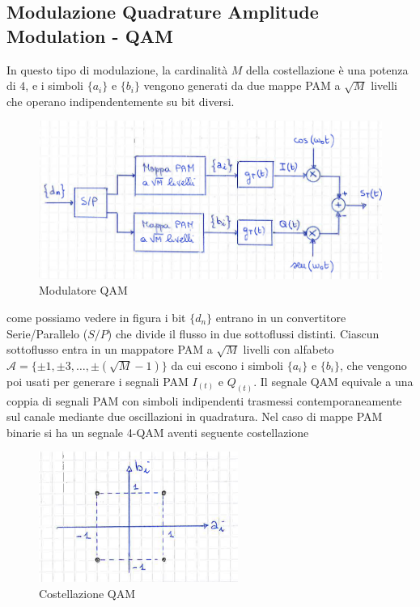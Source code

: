    \subsection{Modulazione Quadrature Amplitude Modulation - QAM}
        In questo tipo di modulazione, la cardinalità $M$ della costellazione è una potenza di $4$, e i simboli $\{a_i\}$ e $\{b_i\}$
        vengono generati da due mappe PAM a $\sqrt{M}$ livelli che operano indipendentemente su bit diversi.
        \begin{figure}[H]
            \centering
            \includegraphics[width = 12cm]{media/modulatore qam.png}
            \caption{Modulatore QAM}
        \end{figure}
        \begin{sloppypar}
            come possiamo vedere in figura i bit $\{d_n\}$ entrano in un convertitore Serie/Parallelo ($S/P$) che divide il flusso in 
            due sottoflussi distinti. Ciascun sottoflusso entra in un mappatore PAM a $\sqrt{M}$ livelli con alfabeto
            ${\mathcal{A} = \{\pm 1, \pm 3,\dots, \pm(\sqrt{M}-1)\}}$ da cui escono i simboli $\{a_i\}$ e $\{b_i\}$, che vengono poi usati per generare 
            i segnali PAM $I_{(t)}$ e $Q_{(t)}$. Il segnale QAM equivale a una coppia di segnali PAM con simboli indipendenti trasmessi 
            contemporaneamente sul canale mediante due oscillazioni in quadratura. Nel caso di mappe PAM binarie si ha un segnale 4-QAM aventi
            seguente costellazione
        \end{sloppypar}
        \begin{figure}[H]
            \centering
            \includegraphics[width = 6.5cm]{media/costellazione qam.png}
            \caption{Costellazione QAM}
        \end{figure}
